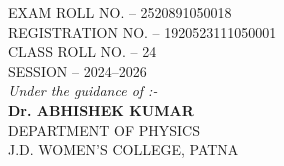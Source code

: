 \documentclass[12pt]{report}
\newcommand{\GuideName}{Dr. ABHISHEK KUMAR}
\newcommand{\DepartmentName}{Department of Physics}
\newcommand{\CollegeName}{J.D. Women's College, Patna}
\newcommand{\ClassRollNo}{24}
\newcommand{\ExamRollNo}{2520891050018}
\newcommand{\RegistrationNo}{1920523111050001}
\newcommand{\SessionYears}{2024--2026}
\begin{document}
\begin{titlepage}
\begin{minipage}[t][0.85\textheight][s]{0.68\textwidth}
    \vspace{0.04cm}
    {\fontsize{11}{13.5}\selectfont EXAM ROLL NO. -- \ExamRollNo\\}
    \vspace{0.04cm}
    {\fontsize{11}{13.5}\selectfont REGISTRATION NO. -- \RegistrationNo\\}
    \vspace{0.04cm}
    {\fontsize{11}{13.5}\selectfont CLASS ROLL NO. -- \ClassRollNo\\}
    \vspace{0.04cm}
    {\fontsize{11}{13.5}\selectfont SESSION -- \SessionYears\\}
    \vfill
    \vspace{0.15cm}
    {\fontsize{11.5}{14}\selectfont \textit{Under the guidance of :-}\\}
    \vspace{0.12cm}
    {\fontsize{15}{18}\selectfont \textbf{\GuideName}\\}
    \vspace{0.06cm}
    {\fontsize{11.5}{14}\selectfont \MakeUppercase{\DepartmentName}\\}
    {\fontsize{11.5}{14}\selectfont \MakeUppercase{\CollegeName}\\}
    \end{minipage}
\end{titlepage}
\nopagecolor
\end{document}
